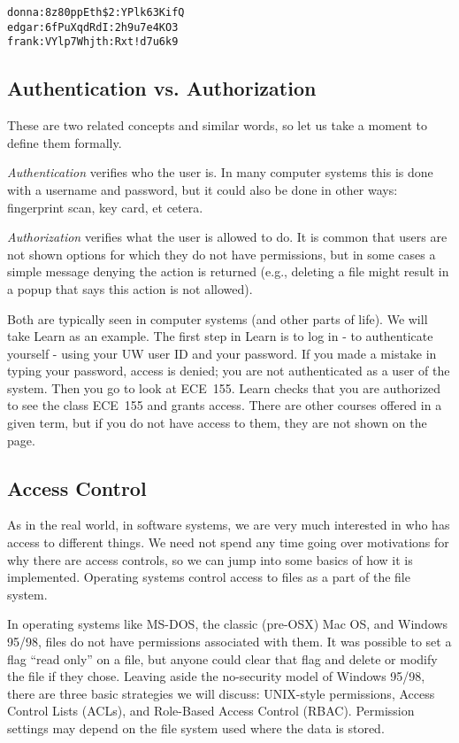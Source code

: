 \begin{verbatim}
donna:8z80ppEth$2:YPlk63KifQ
edgar:6fPuXqdRdI:2h9u7e4KO3
frank:VYlp7Whjth:Rxt!d7u6k9
\end{verbatim}

\subsection*{Authentication vs. Authorization}
These are two related concepts and similar words, so let us take a moment to define them formally.

\textit{Authentication} verifies who the user is. In many computer systems this is done with a username and password, but it could also be done in other ways: fingerprint scan, key card, et cetera.

\textit{Authorization} verifies what the user is allowed to do.  It is common that users are not shown options for which they do not have permissions, but in some cases a simple message denying the action is returned (e.g., deleting a file might result in a popup that says this action is not allowed).

Both are typically seen in computer systems (and other parts of life). We will take Learn as an example. The first step in Learn is to log in - to authenticate yourself - using your UW user ID and your password. If you made a mistake in typing your password, access is denied; you are not authenticated as a user of the system. Then you go to look at ECE~155. Learn checks that you are authorized to see the class ECE~155 and grants access. There are other courses offered in a given term, but if you do not have access to them, they are not shown on the page.

\subsection*{Access Control} 
As in the real world, in software systems, we are very much interested in who has access to different things. We need not spend any time going over motivations for why there are access controls, so we can jump into some basics of how it is implemented. Operating systems control access to files as a part of the file system.

In operating systems like MS-DOS, the classic (pre-OSX) Mac OS, and Windows 95/98, files do not have permissions associated with them. It was possible to set a flag ``read only'' on a file, but anyone could clear that flag and delete or modify the file if they chose. Leaving aside the no-security model of Windows 95/98, there are three basic strategies we will discuss: UNIX-style permissions, Access Control Lists (ACLs), and Role-Based Access Control (RBAC). Permission settings may depend on the file system used where the data is stored.

